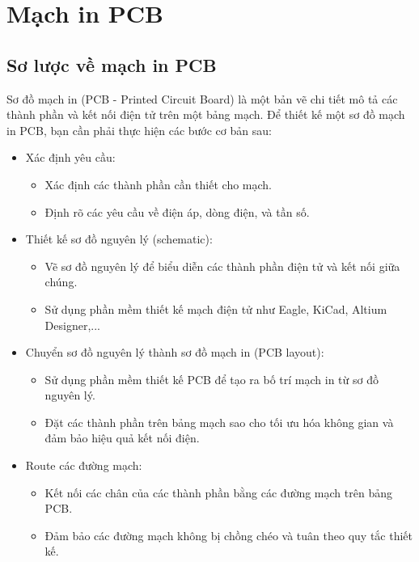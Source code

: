     \section{Mạch in PCB}
        \subsection{Sơ lược về mạch in PCB}
            Sơ đồ mạch in (PCB - Printed Circuit Board) là một bản vẽ chi tiết mô tả các
            thành phần và kết nối điện tử trên một bảng mạch. Để thiết kế một sơ đồ mạch in PCB,
            bạn cần phải thực hiện các bước cơ bản sau: 
            \begin{itemize}
                \item Xác định yêu cầu:
                \begin{itemize}
                    \item Xác định các thành phần cần thiết cho mạch.
                    \item Định rõ các yêu cầu về điện áp, dòng điện, và tần số.
                \end{itemize}
                \item Thiết kế sơ đồ nguyên lý (schematic):
                \begin{itemize}
                    \item Vẽ sơ đồ nguyên lý để biểu diễn các thành phần điện tử và kết nối giữa chúng.
                    \item Sử dụng phần mềm thiết kế mạch điện tử như Eagle, KiCad, Altium Designer,...
                \end{itemize}
                \item Chuyển sơ đồ nguyên lý thành sơ đồ mạch in (PCB layout):
                \begin{itemize}
                    \item Sử dụng phần mềm thiết kế PCB để tạo ra bố trí mạch in từ sơ đồ nguyên lý.
                    \item Đặt các thành phần trên bảng mạch sao cho tối ưu hóa không gian và đảm bảo hiệu quả kết nối điện.
                \end{itemize}
                \item Route các đường mạch:
                \begin{itemize}
                    \item Kết nối các chân của các thành phần bằng các đường mạch trên bảng PCB.
                    \item Đảm bảo các đường mạch không bị chồng chéo và tuân theo quy tắc thiết kế.

\end{itemize}
\end{itemize}
